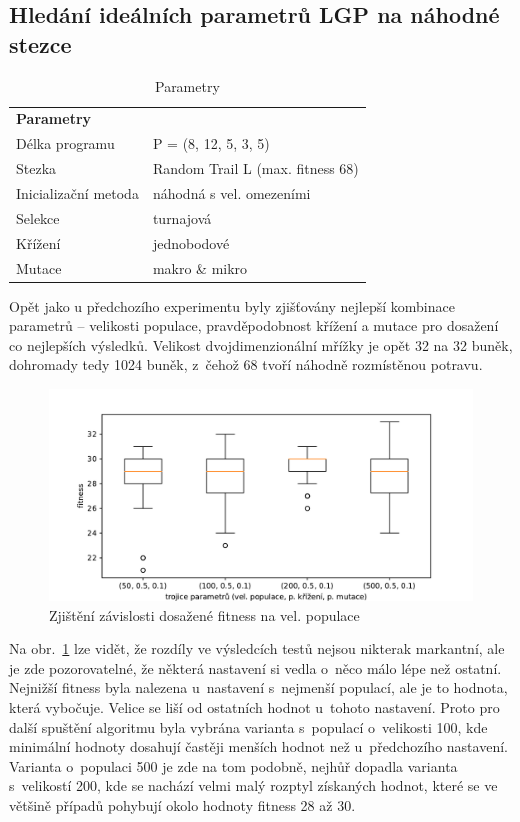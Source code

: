 \subsection{Hledání ideálních parametrů LGP na náhodné stezce} 
\begin{table}[!h]
\centering
\begin{tabular}{ll}
\hline
\textbf{Parametry}      &             \\
Délka programu       & P = (8, 12, 5, 3, 5)  \\
Stezka               & Random Trail L (max. fitness 68) \\
Inicializační metoda & náhodná s vel. omezeními \\
Selekce              & turnajová       \\
Křížení              & jednobodové \\
Mutace               & makro \& mikro \\ 
\hline
\end{tabular}
\caption{Parametry}
\end{table}

Opět jako u předchozího experimentu byly zjišťovány nejlepší kombinace parametrů -- velikosti populace, pravděpodobnost křížení a mutace pro dosažení co nejlepších výsledků. Velikost dvojdimenzionální mřížky je opět 32 na 32 buněk, dohromady tedy 1024 buněk, z~čehož 68 tvoří náhodně rozmístěnou potravu.

\begin{figure}[!h]
    \centering
    \includegraphics[scale=0.75]{obrazky-figures/exp-lgp-random-searching-params-1.pdf}
    \caption{Zjištění závislosti dosažené fitness na vel. populace}
    \label{fig:exp-lgp-random-searching-params-1}
\end{figure}

Na obr.~\ref{fig:exp-lgp-random-searching-params-1} lze vidět, že rozdíly ve výsledcích testů nejsou nikterak markantní, ale je zde pozorovatelné, že některá nastavení si vedla o~něco málo lépe než ostatní. Nejnižší fitness byla nalezena u~nastavení s~nejmenší populací, ale je to hodnota, která vybočuje. Velice se liší od ostatních hodnot u~tohoto nastavení. Proto pro další spuštění algoritmu byla vybrána varianta s~populací o~velikosti 100, kde minimální hodnoty dosahují častěji menších hodnot než u~předchozího nastavení. Varianta o~populaci 500 je zde na tom podobně, nejhůř dopadla varianta s~velikostí 200, kde se nachází velmi malý rozptyl získaných hodnot, které se ve většině případů pohybují okolo hodnoty fitness 28 až 30.  

